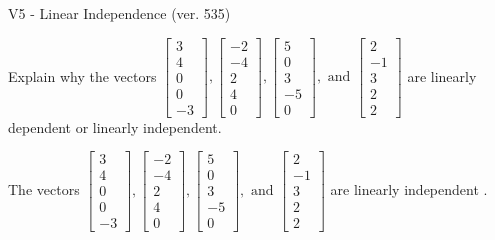 \begin{exercise}
  \begin{exerciseTitle}V5 - Linear Independence (ver. 535)\end{exerciseTitle}
  \begin{exerciseStatement}
    Explain why the vectors \(\left[\begin{array}{r}
3 \\
4 \\
0 \\
0 \\
-3
\end{array}\right] , \left[\begin{array}{r}
-2 \\
-4 \\
2 \\
4 \\
0
\end{array}\right] , \left[\begin{array}{r}
5 \\
0 \\
3 \\
-5 \\
0
\end{array}\right] , \text{ and } \left[\begin{array}{r}
2 \\
-1 \\
3 \\
2 \\
2
\end{array}\right]\) are linearly dependent or linearly independent.	


  \end{exerciseStatement}
  \begin{exerciseAnswer}
   The vectors \(\left[\begin{array}{r}
3 \\
4 \\
0 \\
0 \\
-3
\end{array}\right] , \left[\begin{array}{r}
-2 \\
-4 \\
2 \\
4 \\
0
\end{array}\right] , \left[\begin{array}{r}
5 \\
0 \\
3 \\
-5 \\
0
\end{array}\right] , \text{ and } \left[\begin{array}{r}
2 \\
-1 \\
3 \\
2 \\
2
\end{array}\right]\) are 
  	 linearly independent  .
  


  \end{exerciseAnswer}
\end{exercise}